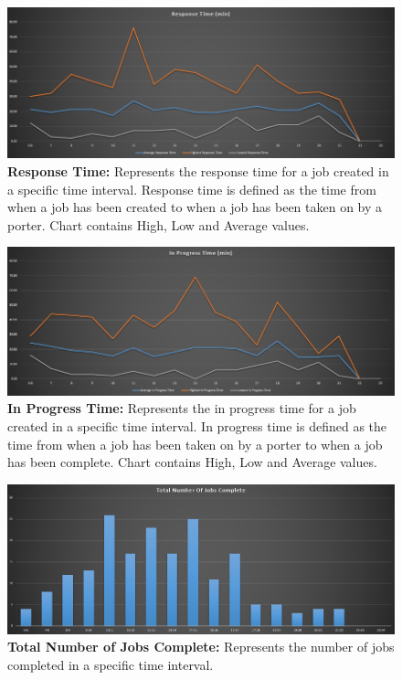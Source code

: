 \documentclass[paper=letter, fontsize=10pt]{scrartcl}
\numberwithin{equation}{section}		%
\numberwithin{figure}{section}			%
\numberwithin{table}{section}				%
\begin{document}
		\begin{figure}[!htbp]		
		\begin{center}
			\includegraphics[width=1\columnwidth, height=0.4\textheight, keepaspectratio]{responseTime.png}
			\caption{\textbf{Response Time:} Represents the response time for a job created in a specific time interval. Response time is defined as the time from when a job has been created to when a job has been taken on by a porter. Chart contains High, Low and Average values.}
		\end{center}
		\end{figure}
		\begin{figure}[!htbp]		
		\begin{center}
			\includegraphics[width=1\columnwidth, height=0.4\textheight, keepaspectratio]{inProgress.png}
			\caption{\textbf{In Progress Time:} Represents the in progress time for a job created in a specific time interval. In progress time is defined as the time from when a job has been taken on by a porter to when a job has been complete. Chart contains High, Low and Average values.}
		\end{center}
		\end{figure}
		\begin{figure}[!htbp]		
		\begin{center}
			\includegraphics[width=1\columnwidth, height=0.4\textheight, keepaspectratio]{numberOfJobs.png}
			\caption{\textbf{Total Number of Jobs Complete:} Represents the number of jobs completed in a specific time interval.}
		\end{center}
		\end{figure}
\end{document}
